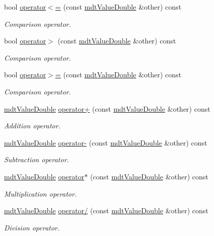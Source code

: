 \begin{DoxyCompactItemize}
bool \hyperlink{classmdt_value_double_a03686549cccc04814c4995186e967cce}{operator$<$=} (const \hyperlink{classmdt_value_double}{mdt\-Value\-Double} \&other) const 
\begin{DoxyCompactList}\small\item\em Comparison operator. \end{DoxyCompactList}\item 
bool \hyperlink{classmdt_value_double_a879f5922431d81c3fd53fe1d9aaed0ff}{operator$>$} (const \hyperlink{classmdt_value_double}{mdt\-Value\-Double} \&other) const 
\begin{DoxyCompactList}\small\item\em Comparison operator. \end{DoxyCompactList}\item 
bool \hyperlink{classmdt_value_double_aefb0eeafda2c1b60e41252f070f44168}{operator$>$=} (const \hyperlink{classmdt_value_double}{mdt\-Value\-Double} \&other) const 
\begin{DoxyCompactList}\small\item\em Comparison operator. \end{DoxyCompactList}\item 
\hyperlink{classmdt_value_double}{mdt\-Value\-Double} \hyperlink{classmdt_value_double_a2afa8c959130890fd5b3f83e77d69fa6}{operator+} (const \hyperlink{classmdt_value_double}{mdt\-Value\-Double} \&other) const 
\begin{DoxyCompactList}\small\item\em Addition operator. \end{DoxyCompactList}\item 
\hyperlink{classmdt_value_double}{mdt\-Value\-Double} \hyperlink{classmdt_value_double_a68b50925026cda18750f6f4bd7909616}{operator-\/} (const \hyperlink{classmdt_value_double}{mdt\-Value\-Double} \&other) const 
\begin{DoxyCompactList}\small\item\em Subtraction operator. \end{DoxyCompactList}\item 
\hyperlink{classmdt_value_double}{mdt\-Value\-Double} \hyperlink{classmdt_value_double_a6948641d8d945e59ec6544494895a276}{operator$\ast$} (const \hyperlink{classmdt_value_double}{mdt\-Value\-Double} \&other) const 
\begin{DoxyCompactList}\small\item\em Multiplication operator. \end{DoxyCompactList}\item 
\hyperlink{classmdt_value_double}{mdt\-Value\-Double} \hyperlink{classmdt_value_double_ab66d05adee9675610e6771803508af60}{operator/} (const \hyperlink{classmdt_value_double}{mdt\-Value\-Double} \&other) const 
\begin{DoxyCompactList}\small\item\em Division operator. \end{DoxyCompactList}\end{DoxyCompactItemize}


